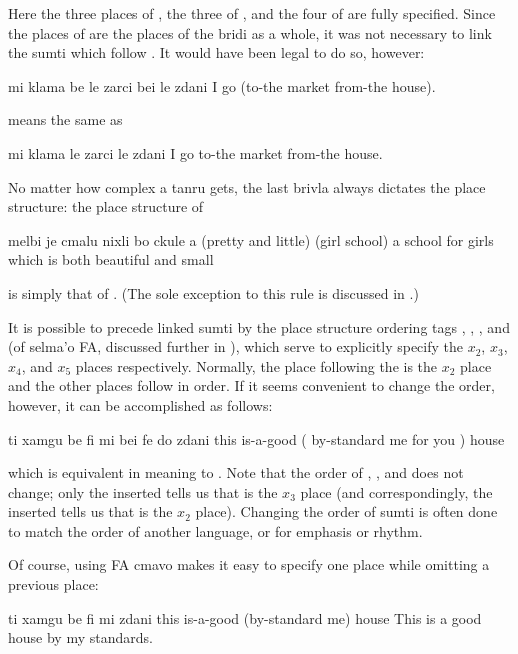 Here the three places of , the three of ,
    and the four of  are fully specified. Since the places
    of  are the places of the bridi as a whole, it was not
    necessary to link the sumti which follow . It would
    have been legal to do so, however:
\begin{example}
mi klama be le zarci bei le zdani \n
I go (to-the market from-the house).
\end{example}

{\noindent}means the same as
\begin{example}
mi klama le zarci le zdani\n
I go to-the market from-the house.
\end{example}

No matter how complex a tanru gets, the last brivla always
    dictates the place structure: the place structure of
\begin{example}
melbi je cmalu nixli bo ckule\n
a (pretty and little) (girl school)\n
a school for girls which is both beautiful and small
\end{example}

{\noindent}is simply that of . (The sole exception to this rule
    is discussed in .) 

It is possible to precede linked sumti by the place
    structure ordering tags , , , and  (of
    selma'o FA, discussed further in ), which serve to explicitly specify the $x_2$, $x_3$, $x_4$, and
    $x_5$ places respectively. Normally, the place following the
     is the $x_2$ place and the other places follow in order. If
    it seems convenient to change the order, however, it can be
    accomplished as follows:
\begin{example}
ti xamgu be fi mi bei fe do  zdani\n
this is-a-good ( by-standard me for you ) house
\end{example}

{\noindent}which is equivalent in meaning to . Note that the order of , , and 
    does not change; only the inserted  tells us that 
    is the $x_3$ place (and correspondingly, the inserted  tells
    us that  is the $x_2$ place). Changing the order of sumti is
    often done to match the order of another language, or for
    emphasis or rhythm. 

Of course, using FA cmavo makes it easy to specify one place
    while omitting a previous place:
\begin{example}
ti xamgu be fi mi  zdani\n
this is-a-good (by-standard me) house\n
This is a good house by my standards.
\end{example}

